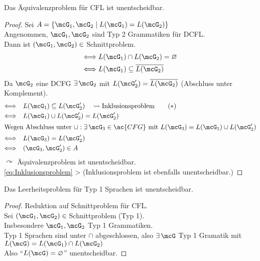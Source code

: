 {\begin{Satz}
	Das Äquivalenzproblem für \ac{CFL} ist unentscheidbar.
\end{Satz}
\begin{proof}
	Sei $A=\{\mcG_1,\mcG_2 \mid L(\mcG_1)=L(\mcG_2)\}$\\
	Angenommen, $\mcG_1,\mcG_2$ sind Typ 2 Grammatiken für \ac{DCFL}.\\
	Dann ist $(\mcG_1,\mcG_2)\in{}$Schnittproblem.
	\begin{align*}
		\<==> L(\mcG_1) &\cap L(\mcG_2)=\varnothing\\
		\<==> L(\mcG_1) &\subseteq \overline{L(\mcG_2)}
	\end{align*}
	Da $\mcG_2$ eine \ac{DCFG} $\exists\,\mcG_2$ mit $L(\mcG'_2)=\overline{L(\mcG_2)}$ (Abschluss unter Komplement).
	\begin{align*}
		\<==>\quad & L(\mcG_1) \subseteq L(\mcG'_2) \quad\leadsto\text{Inklusionsproblem} \tag{$*$}\label{eq:Inklusionsproblem}\\
		\<==>\quad & L(\mcG_1) \cup L(\mcG'_2) = L(\mcG'_2)\\
	\shortintertext{Wegen Abschluss unter $\cup:\exists\,\mcG_3\in\ac{CFG}$ mit $L(\mcG_3)=L(\mcG_1)\cup L(\mcG'_2)$}
		\<==>\quad & L(\mcG_3)=L(\mcG'_2)\\
		\<==>\quad & (\mcG_3,\mcG'_2)\in A
	\end{align*}
	$\curvearrowright$ Äquivalenzproblem ist unentscheidbar.\\
	\eqref{eq:Inklusionsproblem} \-> (Inklusionsproblem ist ebenfalls unentscheidbar.)
\end{proof}

\begin{Satz}
	Das Leerheitsproblem für Typ 1 Sprachen ist unentscheidbar.
\end{Satz}
\begin{proof}
	Reduktion auf Schnittproblem für \ac{CFL}.\\
	Sei $(\mcG_1,\mcG_2)\in{}$Schnittproblem (Typ 1).\\
	Insbesondere $\mcG_1,\mcG_2$ Typ 1 Grammatiken.\\
	Typ 1 Sprachen sind unter $\cap$ abgeschlossen, also $\exists\, \mcG$ Typ 1 Gramatik mit $L(\mcG)=L(\mcG_1)\cap L(\mcG_2)$\\
	Also "`$L(\mcG)=\varnothing$"' unentscheidbar.
\end{proof}
}

